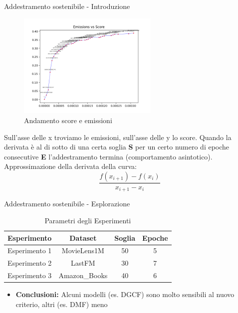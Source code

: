 \begin{frame}{Addestramento sostenibile - Introduzione}
    \begin{figure}
        \centering
        \includegraphics[width=0.6\textwidth, height=0.6\textheight]{images/curve_emissions_score.png}
        \caption{Andamento score e emissioni}
    \end{figure} 
Sull'asse delle x troviamo le emissioni, sull'asse delle y lo score. Quando la derivata è al di sotto di una certa soglia \textbf{S} per un certo numero di epoche consecutive \textbf{E} l'addestramento termina (comportamento asintotico).
Approssimazione della derivata della curva:
\begin{equation*}
    \frac{f(x_{i+1}) - f(x_i)}{x_{i+1} - x_i}
\end{equation*}
\end{frame}

\begin{frame}{Addestramento sostenibile - Esplorazione}
    \begin{table}[]
        \centering
        \begin{tabular}{|c|c|c|c|}
            \hline
            \textbf{Esperimento} & \textbf{Dataset} & \textbf{Soglia} & \textbf{Epoche} \\ \hline
            Esperimento 1 & MovieLens1M & 50 & 5 \\ \hline
            Esperimento 2 & LastFM & 30 & 7 \\ \hline
            Esperimento 3 & Amazon\_Books & 40 & 6 \\ \hline
        \end{tabular}
        \caption{Parametri degli Esperimenti}
    \end{table}
    \begin{itemize}
        \item \textbf{Conclusioni:} Alcuni modelli (es. DGCF) sono molto sensibili al nuovo criterio, altri (es. DMF) meno
    \end{itemize}
\end{frame}


